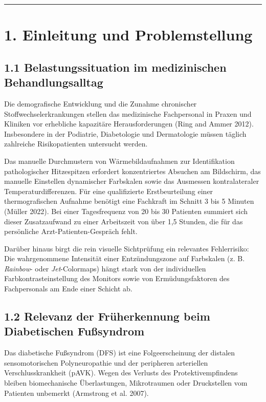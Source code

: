 \documentclass[
  11pt,
]{article}
\begin{document}
\begin{center}\rule{0.5\linewidth}{0.5pt}\end{center}

\section{1. Einleitung und
Problemstellung}\label{einleitung-und-problemstellung}

\subsection{1.1 Belastungssituation im medizinischen
Behandlungsalltag}\label{belastungssituation-im-medizinischen-behandlungsalltag}

Die demografische Entwicklung und die Zunahme chronischer
Stoffwechselerkrankungen stellen das medizinische Fachpersonal in Praxen
und Kliniken vor erhebliche kapazitäre Herausforderungen (Ring and Ammer
2012). Insbesondere in der Podiatrie, Diabetologie und Dermatologie
müssen täglich zahlreiche Risikopatienten untersucht werden.

Das manuelle Durchmustern von Wärmebildaufnahmen zur Identifikation
pathologischer Hitzespitzen erfordert konzentriertes Absuchen am
Bildschirm, das manuelle Einstellen dynamischer Farbskalen sowie das
Ausmessen kontralateraler Temperaturdifferenzen. Für eine qualifizierte
Erstbeurteilung einer thermografischen Aufnahme benötigt eine Fachkraft
im Schnitt 3 bis 5 Minuten (Müller 2022). Bei einer Tagesfrequenz von 20
bis 30 Patienten summiert sich dieser Zusatzaufwand zu einer Arbeitszeit
von über 1,5 Stunden, die für das persönliche Arzt-Patienten-Gespräch
fehlt.

Darüber hinaus birgt die rein visuelle Sichtprüfung ein relevantes
Fehlerrisiko: Die wahrgenommene Intensität einer Entzündungszone auf
Farbskalen (z. B. \emph{Rainbow}- oder \emph{Jet}-Colormaps) hängt stark
von der individuellen Farbkontrasteinstellung des Monitors sowie von
Ermüdungsfaktoren des Fachpersonals am Ende einer Schicht ab.

\subsection{1.2 Relevanz der Früherkennung beim Diabetischen
Fußsyndrom}\label{relevanz-der-fruxfcherkennung-beim-diabetischen-fuuxdfsyndrom}

Das diabetische Fußsyndrom (DFS) ist eine Folgeerscheinung der distalen
sensomotorischen Polyneuropathie und der peripheren arteriellen
Verschlusskrankheit (pAVK). Wegen des Verlusts des Protektivempfindens
bleiben biomechanische Überlastungen, Mikrotraumen oder Druckstellen vom
Patienten unbemerkt (Armstrong et al. 2007).
\end{document}
